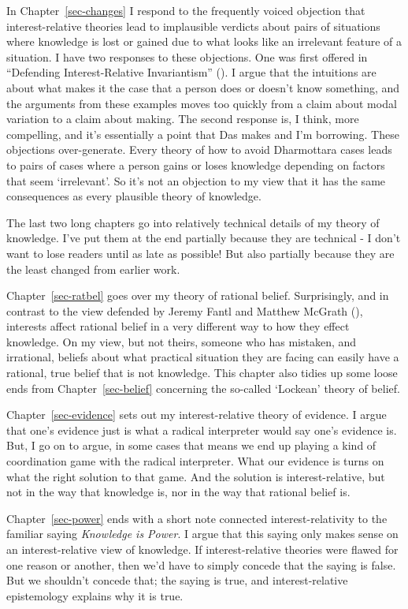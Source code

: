 \documentclass[
  12pt,
  letterpaper,
]{scrbook}
\begin{document}
In Chapter~\ref{sec-changes} I respond to the frequently voiced
objection that interest-relative theories lead to implausible verdicts
about pairs of situations where knowledge is lost or gained due to what
looks like an irrelevant feature of a situation. I have two responses to
these objections. One was first offered in ``Defending Interest-Relative
Invariantism'' ().
I argue that the intuitions are about what makes it the case that a
person does or doesn't know something, and the arguments from these
examples moves too quickly from a claim about modal variation to a claim
about making. The second response is, I think, more compelling, and it's
essentially a point that Das makes and I'm borrowing. These objections
over-generate. Every theory of how to avoid Dharmottara cases leads to
pairs of cases where a person gains or loses knowledge depending on
factors that seem `irrelevant'. So it's not an objection to my view that
it has the same consequences as every plausible theory of knowledge.

The last two long chapters go into relatively technical details of my
theory of knowledge. I've put them at the end partially because they are
technical - I don't want to lose readers until as late as possible! But
also partially because they are the least changed from earlier work.

Chapter~\ref{sec-ratbel} goes over my theory of rational belief.
Surprisingly, and in contrast to the view defended by Jeremy Fantl and
Matthew McGrath (), interests
affect rational belief in a very different way to how they effect
knowledge. On my view, but not theirs, someone who has mistaken, and
irrational, beliefs about what practical situation they are facing can
easily have a rational, true belief that is not knowledge. This chapter
also tidies up some loose ends from Chapter~\ref{sec-belief} concerning
the so-called `Lockean' theory of belief.

Chapter~\ref{sec-evidence} sets out my interest-relative theory of
evidence. I argue that one's evidence just is what a radical interpreter
would say one's evidence is. But, I go on to argue, in some cases that
means we end up playing a kind of coordination game with the radical
interpreter. What our evidence is turns on what the right solution to
that game. And the solution is interest-relative, but not in the way
that knowledge is, nor in the way that rational belief is.

Chapter~\ref{sec-power} ends with a short note connected
interest-relativity to the familiar saying \emph{Knowledge is Power}. I
argue that this saying only makes sense on an interest-relative view of
knowledge. If interest-relative theories were flawed for one reason or
another, then we'd have to simply concede that the saying is false. But
we shouldn't concede that; the saying is true, and interest-relative
epistemology explains why it is true.
\end{document}
